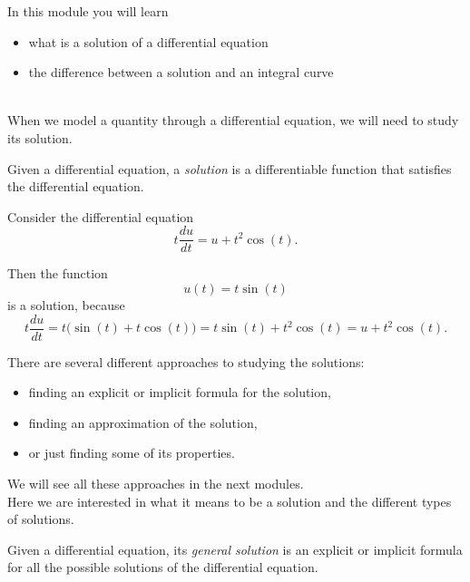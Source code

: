 In this module you will learn
\begin{itemize}
	\item what is a solution of a differential equation
	\item the difference between a solution and an integral curve
\end{itemize}

\hfill \\[-10pt]

When we model a quantity through a differential equation, we will need to study its solution.

%
%
%
%

\begin{definition}[Solution]
	Given a differential equation, a \emph{solution} is a differentiable function that satisfies the differential equation.
\end{definition}

\begin{example}
Consider the differential equation
$$
t \frac{du}{dt} = u + t^2 \cos(t).
$$

Then the function 
$$
u(t) = t\sin(t)
$$
is a solution, because
$$
t \frac{du}{dt} = t \big( \sin(t) + t \cos(t) \big) = t \sin(t) + t^2 \cos (t) = u + t^2 \cos(t).
$$
\end{example}


There are several different approaches to studying the solutions:
\begin{itemize}
	\item finding an explicit or implicit formula for the solution,
	\item finding an approximation of the solution,
	\item or just finding some of its properties.
\end{itemize}

We will see all these approaches in the next modules.\\

Here we are interested in what it means to be a solution and the different types of solutions.

\begin{definition}
Given a differential equation, its \emph{general solution} is an explicit or implicit formula for all the possible solutions of the differential equation.
\end{definition}

